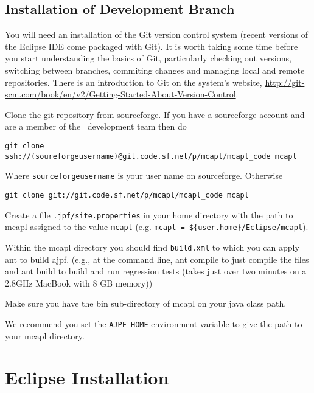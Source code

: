 \subsection{Installation of Development Branch}

You will need an installation of the Git version control system (recent versions of the Eclipse IDE come packaged with Git).  It is worth taking some time before you start understanding the basics of Git, particularly checking out versions, switching between branches, commiting changes and managing local and remote repositories.  There is an introduction to Git on the system's website, \url{http://git-scm.com/book/en/v2/Getting-Started-About-Version-Control}.

\begin{itemize}
\begin{sloppypar}
\item Clone the git repository from sourceforge.  If you have a sourceforge account and are a member of the \ajpf\ development team then do
\begin{small}
\begin{verbatim}
git clone ssh://(soureforgeusername)@git.code.sf.net/p/mcapl/mcapl_code mcapl
\end{verbatim}
\end{small}
Where \texttt{sourceforgeusername} is your user name on sourceforge.  Otherwise
\begin{verbatim}
git clone git://git.code.sf.net/p/mcapl/mcapl_code mcapl
\end{verbatim}
\end{sloppypar}
\item Create a file \texttt{.jpf/site.properties} in your home directory with the path to mcapl assigned to the value \texttt{mcapl} (e.g. \texttt{mcapl = \$\{user.home\}/Eclipse/mcapl}).
\item Within the mcapl directory you should find \texttt{build.xml} to which you can apply ant to build ajpf. (e.g., at the command line, ant compile to just compile the files and ant build to build and run regression tests (takes just over two minutes on a 2.8GHz MacBook with 8 GB memory))
\item Make sure you have the bin sub-directory of mcapl on your java class path.
\item We recommend you set the \texttt{AJPF\_HOME} environment variable to give the path to your mcapl directory.
\end{itemize}

\section{Eclipse Installation}

